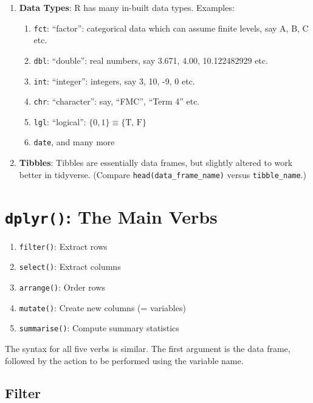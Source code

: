 \documentclass[]{article}
\providecommand{\tightlist}{%
  \setlength{\itemsep}{0pt}\setlength{\parskip}{0pt}}
\begin{document}
\begin{enumerate}
\def\labelenumi{\arabic{enumi}.}
\tightlist
\item
  \textbf{Data Types}: R has many in-built data types. Examples:

  \begin{enumerate}
  \def\labelenumii{\roman{enumii}.}
  \tightlist
  \item
    \texttt{fct}: ``factor'': categorical data which can assume finite
    levels, say A, B, C etc.
  \item
    \texttt{dbl}: ``double'': real numbers, say 3.671, 4.00,
    10.122482929 etc.
  \item
    \texttt{int}: ``integer'': integers, say 3, 10, -9, 0 etc.
  \item
    \texttt{chr}: ``character'': say, ``FMC'', ``Term 4'' etc.
  \item
    \texttt{lgl}: ``logical'': \(\{0, 1\}\equiv \{\text{T, F}\}\)
  \item
    \texttt{date}, and many more
  \end{enumerate}
\item
  \textbf{Tibbles}: Tibbles are essentially data frames, but slightly
  altered to work better in tidyverse. (Compare
  \texttt{head(data\_frame\_name)} versus \texttt{tibble\_name}.)
\end{enumerate}

\section{\texorpdfstring{\texttt{dplyr()}: The Main
Verbs}{dplyr(): The Main Verbs}}\label{dplyr-the-main-verbs}

\begin{enumerate}
\def\labelenumi{\arabic{enumi}.}
\tightlist
\item
  \texttt{filter()}: Extract rows
\item
  \texttt{select()}: Extract columns
\item
  \texttt{arrange()}: Order rows
\item
  \texttt{mutate()}: Create new columns (= variables)
\item
  \texttt{summarise()}: Compute summary statistics
\end{enumerate}

The syntax for all five verbs is similar. The first argument is the data
frame, followed by the action to be performed using the variable name.

\subsection{Filter}\label{filter}
\end{document}
